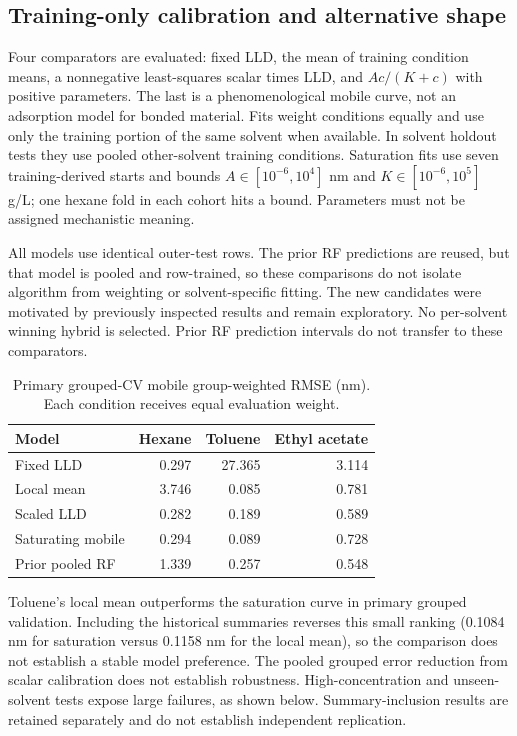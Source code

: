 \subsection{Training-only calibration and alternative shape}

Four comparators are evaluated: fixed LLD, the mean of training condition means, a nonnegative least-squares scalar times LLD, and $Ac/(K+c)$ with positive parameters. The last is a phenomenological mobile curve, not an adsorption model for bonded material. Fits weight conditions equally and use only the training portion of the same solvent when available. In solvent holdout tests they use pooled other-solvent training conditions. Saturation fits use seven training-derived starts and bounds $A\in[10^{-6},10^4]$ nm and $K\in[10^{-6},10^5]$ g/L; one hexane fold in each cohort hits a bound. Parameters must not be assigned mechanistic meaning.

All models use identical outer-test rows. The prior RF predictions are reused, but that model is pooled and row-trained, so these comparisons do not isolate algorithm from weighting or solvent-specific fitting. The new candidates were motivated by previously inspected results and remain exploratory. No per-solvent winning hybrid is selected. Prior RF prediction intervals do not transfer to these comparators.

\begin{table}[H]\centering\small\caption{Primary grouped-CV mobile group-weighted RMSE (nm). Each condition receives equal evaluation weight.}\begin{tabular}{lrrr}\toprule Model & Hexane & Toluene & Ethyl acetate \\\midrule

Fixed LLD & 0.297 & 27.365 & 3.114 \\

Local mean & 3.746 & 0.085 & 0.781 \\

Scaled LLD & 0.282 & 0.189 & 0.589 \\

Saturating mobile & 0.294 & 0.089 & 0.728 \\

Prior pooled RF & 1.339 & 0.257 & 0.548 \\

\bottomrule\end{tabular}\end{table}

Toluene's local mean outperforms the saturation curve in primary grouped validation. Including the historical summaries reverses this small ranking (0.1084 nm for saturation versus 0.1158 nm for the local mean), so the comparison does not establish a stable model preference. The pooled grouped error reduction from scalar calibration does not establish robustness. High-concentration and unseen-solvent tests expose large failures, as shown below. Summary-inclusion results are retained separately and do not establish independent replication.

